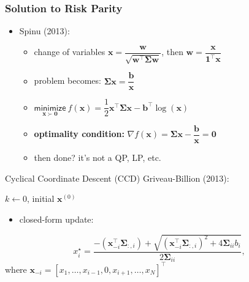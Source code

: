 \documentclass[aspectratio=169]{beamer}
\begin{document}
        \begin{frame}
          \frametitle{Solution to Risk Parity}
          \vspace{.5cm}
          \begin{itemize}
            \item Spinu (2013):
            \begin{itemize}
            \item change of variables $\bm{x} = \dfrac{\bm{w}}{\sqrt{\bm{w}^\top\boldsymbol{\Sigma}\bm{w}}}$, then $\bm{w} = \dfrac{\bm{x}}{\mathbf{1}^\top\bm{x}}$
            \item problem becomes: $\boldsymbol{\Sigma}\bm{x} = \dfrac{\bm{b}}{\bm{x}}$
            \item $\underset{\bm{x} \succ \mathbf{0}}{\textsf{minimize}} ~f(\bm{x}) = \dfrac{1}{2}\bm{x}^\top\boldsymbol{\Sigma}\bm{x} - \bm{b}^\top\log(\bm{x})$
            \item \textbf{optimality condition:} $\nabla f(\bm{x}) = \boldsymbol{\Sigma}\bm{x} - \dfrac{\bm{b}}{\bm{x}} = \mathbf{0}$
            \item then done? it's not a QP, LP, etc.
           \end{itemize}
          \end{itemize}
        \end{frame}

        \begin{frame}{Cyclical Coordinate Descent (CCD)}
          \vspace{.5cm}
          Griveau-Billion (2013):

          \begin{algorithm}[H]
            \SetAlgoLined
            \caption{CCD to solve risk parity}
            $k \leftarrow 0$, initial $\bm{x}^{(0)}$\\
          \end{algorithm}
          \begin{itemize}
            \item closed-form update:
          \end{itemize}
          \begin{equation*}
            x_i^\star = \frac{-\left(\bm{x}_{-i}^\top\boldsymbol{\Sigma}_{:,i}\right)+\sqrt{\left(\bm{x}_{-i}^\top\boldsymbol{\Sigma}_{:,i}\right)^2+
            4\boldsymbol{\Sigma}_{ii}b_i}}{2\boldsymbol{\Sigma}_{ii}},
          \end{equation*}
          where $\bm{x}_{-i} = \left[x_1, \dots, x_{i-1}, 0, x_{i+1}, \dots, x_{N}\right]^\top$
        \end{frame}
\end{document}
